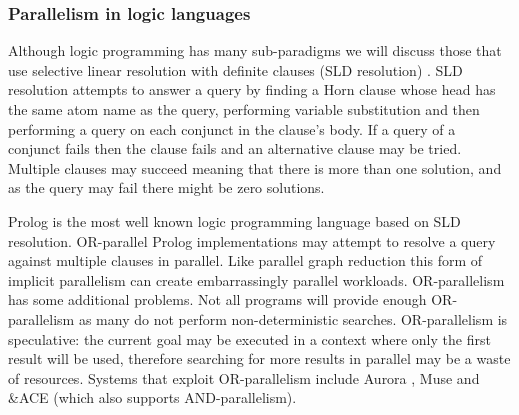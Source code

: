 \subsubsection{Parallelism in logic languages}
\label{sec:intro_par_logic}

Although logic programming has many sub-paradigms we will discuss
those that use selective linear resolution with definite clauses
(SLD resolution) \citep{kowalski_sld}.
SLD resolution attempts to answer a query by finding a Horn clause whose
head has the same atom name as the query,
performing variable substitution and then performing a query on each
conjunct in the clause's body.
If a query of a conjunct fails then the clause fails and an alternative
clause may be tried.
Multiple clauses may succeed meaning that there is more than one solution,
and as the query may fail there might be zero solutions.

Prolog is the most well known logic programming language based on SLD
resolution.
OR-parallel Prolog implementations may attempt to resolve a query against
multiple clauses in parallel.
Like parallel graph reduction this form of implicit parallelism can create
embarrassingly parallel workloads.
OR-parallelism has some additional problems.
Not all programs will provide enough OR-parallelism as many do not perform
non-deterministic searches.
OR-parallelism is speculative:
the current goal may be executed in a context where only the first result
will be used,
therefore searching for more results in parallel may be a waste of
resources.
Systems that exploit OR-parallelism include
Aurora \citep*{lusk:1990:aurora},
Muse \citep*{ali:1990:muse}
and \&ACE \citep*{gupta:1991:ace} (which also supports AND-parallelism).

